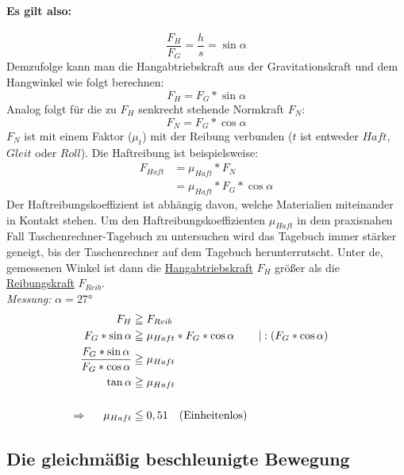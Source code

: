 	\paragraph{Es gilt also:}
	\begin{equation}
		\dfrac{F_H}{F_G} = \dfrac{h}{s} = \sin\alpha
	\end{equation}
	Demzufolge kann man die Hangabtriebskraft aus der Gravitationskraft und dem Hangwinkel wie folgt berechnen:
	\begin{equation}
	F_H = F_G*\sin\alpha
	\end{equation}
	Analog folgt für die zu $ F_H $ senkrecht stehende Normkraft $ F_N $:
	\begin{equation}
	F_N = F_G*\cos\alpha
	\end{equation}
	$ F_N $ ist mit einem Faktor ($ \mu_t $) mit der Reibung verbunden ($ t $ ist entweder $ Haft $, $ Gleit $ oder $ Roll $). Die Haftreibung ist beispielsweise:
	\begin{align}
		F_{Haft} &= \mu_{Haft}*F_N\\
		&= \mu_{Haft}*F_G*\cos\alpha
	\end{align}
	Der Haftreibungskoeffizient ist abhängig davon, welche Materialien miteinander in Kontakt stehen.
	Um den Haftreibungskoeffizienten $ \mu_{Haft} $ in dem praxisnahen Fall Taschenrechner-Tagebuch zu untersuchen wird das Tagebuch immer stärker geneigt, bis der Taschenrechner auf dem Tagebuch herunterrutscht. Unter de, gemessenen Winkel ist dann die \underline{Hangabtriebskraft} $ F_H $ größer als die \underline{Reibungskraft} $ F_{Reib} $.\\
	\emph{Messung:} $ \alpha = 27° $
	\begin{align}
		F_H &\geqq F_{Reib}\\
		F_G*\sin\alpha &\geqq \mu_{Haft}*F_G*\cos\alpha\ && |:(F_G*\cos\alpha)\\
		\dfrac{F_G*\sin\alpha}{F_G*\cos\alpha} &\geqq \mu_{Haft}\\
		\tan\alpha &\geqq \mu_{Haft}\\
		\nonumber\\
		\Rightarrow\hspace{0.5cm} \mu_{Haft} &\leqq 0,51 \quad \text{(Einheitenlos)}
	\end{align}
	
	\subsection{Die gleichmäßig beschleunigte Bewegung}
